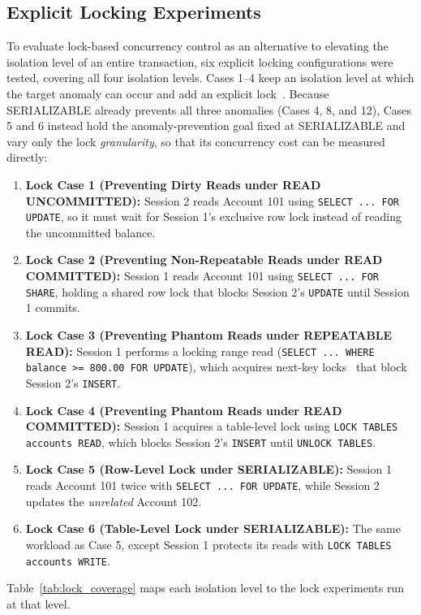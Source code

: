 \documentclass[sigconf, pbalance, nonacm]{acmart}
\begin{document}
\subsection{Explicit Locking Experiments}
To evaluate lock-based concurrency control as an alternative to elevating the isolation level of an entire transaction, six explicit locking configurations were tested, covering all four isolation levels. Cases 1--4 keep an isolation level at which the target anomaly can occur and add an explicit lock~\cite{MySQLLockingReads,MySQLLockTables}. Because SERIALIZABLE already prevents all three anomalies (Cases 4, 8, and 12), Cases 5 and 6 instead hold the anomaly-prevention goal fixed at SERIALIZABLE and vary only the lock \emph{granularity}, so that its concurrency cost can be measured directly:
\begin{enumerate}
    \item \textbf{Lock Case 1 (Preventing Dirty Reads under READ UNCOMMITTED):} Session 2 reads Account 101 using \texttt{SELECT ... FOR UPDATE}, so it must wait for Session 1's exclusive row lock instead of reading the uncommitted balance.
    \item \textbf{Lock Case 2 (Preventing Non-Repeatable Reads under READ COMMITTED):} Session 1 reads Account 101 using \texttt{SELECT ... FOR SHARE}, holding a shared row lock that blocks Session 2's \texttt{UPDATE} until Session 1 commits.
    \item \textbf{Lock Case 3 (Preventing Phantom Reads under REPEATABLE READ):} Session 1 performs a locking range read (\texttt{SELECT ... WHERE balance >= 800.00 FOR UPDATE}), which acquires next-key locks~\cite{MySQLNextKey} that block Session 2's \texttt{INSERT}.
    \item \textbf{Lock Case 4 (Preventing Phantom Reads under READ COMMITTED):} Session 1 acquires a table-level lock using \texttt{LOCK TABLES accounts READ}, which blocks Session 2's \texttt{INSERT} until \texttt{UNLOCK TABLES}.
    \item \textbf{Lock Case 5 (Row-Level Lock under SERIALIZABLE):} Session 1 reads Account 101 twice with \texttt{SELECT ... FOR UPDATE}, while Session 2 updates the \emph{unrelated} Account 102.
    \item \textbf{Lock Case 6 (Table-Level Lock under SERIALIZABLE):} The same workload as Case 5, except Session 1 protects its reads with \texttt{LOCK TABLES accounts WRITE}.
\end{enumerate}

Table~\ref{tab:lock_coverage} maps each isolation level to the lock experiments run at that level.
\end{document}
